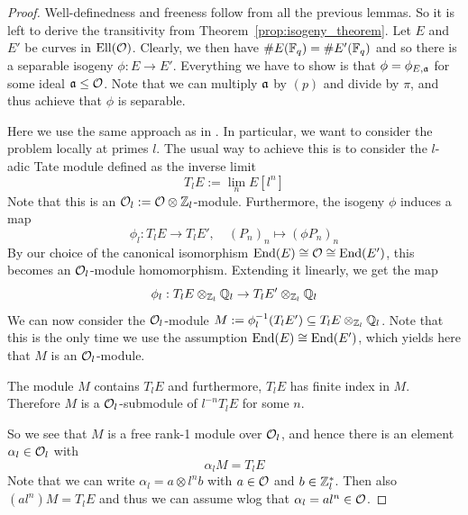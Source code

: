 \begin{proof}
    Well-definedness and freeness follow from all the previous lemmas.
    So it is left to derive the transitivity from Theorem~\ref{prop:isogeny_theorem}.
    Let $E$ and $E'$ be curves in $\mathrm{Ell}(\mathcal{O})$.
    Clearly, we then have $\#E(\mathbb{F}_q) = \#E'(\mathbb{F}_q)$ and so there is a separable isogeny $\phi: E \to E'$.
    Everything we have to show is that $\phi = \phi_{E, \mathfrak{a}}$ for some ideal $\mathfrak{a} \leq \mathcal{O}$.
    Note that we can multiply $\mathfrak{a}$ by $(p)$ and divide by $\pi$, and thus achieve that $\phi$ is separable.

    Here we use the same approach as in \cite[Thm~4.5]{class_group_action_waterhouse}.
    In particular, we want to consider the problem locally at primes $l$.
    The usual way to achieve this is to consider the $l$-adic Tate module defined as the inverse limit
    \begin{equation*}
        T_lE := \lim_n E[l^n]
    \end{equation*}
    Note that this is an $\mathcal{O}_l := \mathcal{O} \otimes \mathbb{Z}_l$-module.
    Furthermore, the isogeny $\phi$ induces a map
    \begin{equation*}
        \phi_l: T_lE \to T_lE', \quad (P_n)_n \mapsto (\phi P_n)_n
    \end{equation*}
    By our choice of the canonical isomorphism $\mathrm{End}(E) \cong \mathcal{O} \cong \mathrm{End}(E')$, this becomes an $\mathcal{O}_l$-module homomorphism.
    Extending it linearly, we get the map
    \begin{equation*}
        \phi_l: T_lE \otimes_{\mathbb{Z}_l} \mathbb{Q}_l \to T_lE' \otimes_{\mathbb{Z}_l} \mathbb{Q}_l
    \end{equation*}
    We can now consider the $\mathcal{O}_l$-module $M := \phi_l^{-1}(T_lE') \subseteq T_lE \otimes_{\mathbb{Z}_l} \mathbb{Q}_l$.
    Note that this is the only time we use the assumption $\mathrm{End}(E) \cong \mathrm{End}(E')$, which yields here that $M$ is an $\mathcal{O}_l$-module.

    The module $M$ contains $T_lE$ and furthermore, $T_lE$ has finite index in $M$.
    Therefore $M$ is a $\mathcal{O}_l$-submodule of $l^{-n}T_lE$ for some $n$.

    So we see that $M$ is a free rank-1 module over $\mathcal{O}_l$, and hence there is an element $\alpha_l \in \mathcal{O}_l$ with
    \begin{equation*}
        \alpha_l M = T_lE
    \end{equation*}
    Note that we can write $\alpha_l = a \otimes l^n b$ with $a \in \mathcal{O}$ and $b \in \mathbb{Z}_l^*$.
    Then also $(al^n) M = T_lE$ and thus we can assume wlog that $\alpha_l = al^n \in \mathcal{O}$.


\end{proof}
